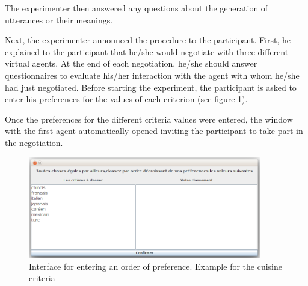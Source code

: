 \documentclass{llncs}
\begin{document}
The experimenter then answered any questions about the generation of utterances or their meanings.

Next, the experimenter announced the procedure to the participant. First, he explained to the participant that he/she would negotiate with three different virtual agents. At the end of each negotiation, he/she should answer  questionnaires to evaluate his/her interaction with the agent with whom he/she had just negotiated.
Before starting the experiment, the participant is asked to enter his preferences for the values of each criterion (see figure \ref{fig:pref}).

Once the preferences for the different criteria values were entered, the window with the first agent automatically opened inviting the participant to take part in the negotiation. 

			\begin{figure}[b]
				\includegraphics[width=4in]{figs/pref.png}
				\caption{\label{fig:pref} Interface for entering an order of preference. Example for the cuisine criteria}
			\end{figure} 
\end{document}
